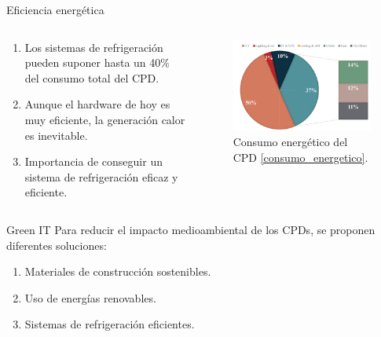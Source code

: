 \documentclass[aspectratio=169, compress]{beamer}
\begin{document}
\begin{frame}{Eficiencia energética}
    \begin{columns}
        \begin{column}{0.5\textwidth}
            \begin{enumerate}
                \item Los sistemas de refrigeración pueden suponer hasta un 40\% del consumo total del CPD. 
                \item Aunque el hardware de hoy es muy eficiente, la generación calor es inevitable. 
                \item Importancia de conseguir un sistema de refrigeración eficaz y eficiente. 
            \end{enumerate}        
        \end{column}
        \begin{column}{0.5\textwidth}  
            \begin{figure}
                \begin{center}
                    \includegraphics[scale=0.5]{../figures/consumo}
                    \caption{Consumo energético del CPD \eqref{consumo_energetico}.}
                    \label{consumo_energetico}
                \end{center}
            \end{figure}        
        \end{column}
    \end{columns}    
\end{frame}

\begin{frame}{Green IT}
    Para reducir el impacto medioambiental de los CPDs, se proponen diferentes soluciones:

    \begin{enumerate}
        \item Materiales de construcción sostenibles.
        \item Uso de energías renovables.
        \item Sistemas de refrigeración eficientes.
    \end{enumerate}


\end{frame}
\end{document}
